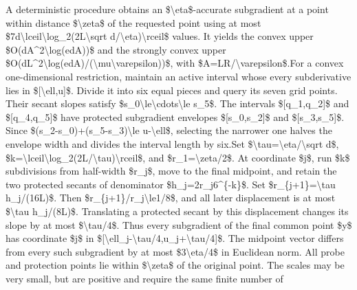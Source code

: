 \documentclass[10pt,a4paper]{article}
\begin{document}
\begingroup\raggedright\sloppy A deterministic procedure obtains an \$\textbackslash{}eta\$-accurate subgradient at a point within distance \$\textbackslash{}zeta\$ of the requested point using at most \$7d\textbackslash{}lceil\textbackslash{}log\_\allowbreak{}2(2L\textbackslash{}sqrt d/\allowbreak{}\textbackslash{}eta)\textbackslash{}rceil\$ values. It yields the convex upper \$O(dA\textasciicircum{}2\textbackslash{}log(edA))\$ and the strongly convex upper \$O(dL\textasciicircum{}2\textbackslash{}log(edA)/\allowbreak{}(\textbackslash{}mu\textbackslash{}varepsilon))\$,\allowbreak{} with \$A=\allowbreak{}LR/\allowbreak{}\textbackslash{}varepsilon\$.\newline{}\newline{}For a convex one-dimensional restriction,\allowbreak{} maintain an active interval whose every subderivative lies in \$[\textbackslash{}ell,\allowbreak{}u]\$. Divide it into six equal pieces and query its seven grid points. Their secant slopes satisfy \$s\_\allowbreak{}0\textbackslash{}le\textbackslash{}cdots\textbackslash{}le s\_\allowbreak{}5\$. The intervals \$[q\_\allowbreak{}1,\allowbreak{}q\_\allowbreak{}2]\$ and \$[q\_\allowbreak{}4,\allowbreak{}q\_\allowbreak{}5]\$ have protected subgradient envelopes \$[s\_\allowbreak{}0,\allowbreak{}s\_\allowbreak{}2]\$ and \$[s\_\allowbreak{}3,\allowbreak{}s\_\allowbreak{}5]\$. Since \$(s\_\allowbreak{}2-s\_\allowbreak{}0)+(s\_\allowbreak{}5-s\_\allowbreak{}3)\textbackslash{}le u-\textbackslash{}ell\$,\allowbreak{} selecting the narrower one halves the envelope width and divides the interval length by six.\newline{}\newline{}Set \$\textbackslash{}tau=\allowbreak{}\textbackslash{}eta/\allowbreak{}\textbackslash{}sqrt d\$,\allowbreak{} \$k=\allowbreak{}\textbackslash{}lceil\textbackslash{}log\_\allowbreak{}2(2L/\allowbreak{}\textbackslash{}tau)\textbackslash{}rceil\$,\allowbreak{} and \$r\_\allowbreak{}1=\allowbreak{}\textbackslash{}zeta/\allowbreak{}2\$. At coordinate \$j\$,\allowbreak{} run \$k\$ subdivisions from half-width \$r\_\allowbreak{}j\$,\allowbreak{} move to the final midpoint,\allowbreak{} and retain the two protected secants of denominator \$h\_\allowbreak{}j=\allowbreak{}2r\_\allowbreak{}j6\textasciicircum{}\{-k\}\$. Set \$r\_\allowbreak{}\{j+1\}=\allowbreak{}\textbackslash{}tau h\_\allowbreak{}j/\allowbreak{}(16L)\$. Then \$r\_\allowbreak{}\{j+1\}/\allowbreak{}r\_\allowbreak{}j\textbackslash{}le1/\allowbreak{}8\$,\allowbreak{} and all later displacement is at most \$\textbackslash{}tau h\_\allowbreak{}j/\allowbreak{}(8L)\$. Translating a protected secant by this displacement changes its slope by at most \$\textbackslash{}tau/\allowbreak{}4\$. Thus every subgradient of the final common point \$y\$ has coordinate \$j\$ in \$[\textbackslash{}ell\_\allowbreak{}j-\textbackslash{}tau/\allowbreak{}4,\allowbreak{}u\_\allowbreak{}j+\textbackslash{}tau/\allowbreak{}4]\$. The midpoint vector differs from every such subgradient by at most \$3\textbackslash{}eta/\allowbreak{}4\$ in Euclidean norm. All probe and protection points lie within \$\textbackslash{}zeta\$ of the original point. The scales may be very small,\allowbreak{} but are positive and require the same finite number of 
\end{document}
